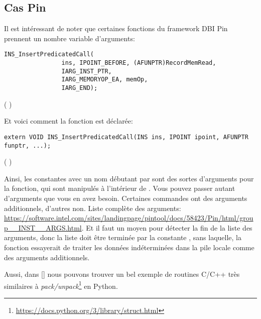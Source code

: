 \subsection{Cas Pin}

Il est intéressant de noter que certaines fonctions du framework \ac{DBI} Pin prennent
un nombre variable d'arguments:

\begin{lstlisting}[style=customc]
            INS_InsertPredicatedCall(
                ins, IPOINT_BEFORE, (AFUNPTR)RecordMemRead,
                IARG_INST_PTR,
                IARG_MEMORYOP_EA, memOp,
                IARG_END);
\end{lstlisting}
(  )

Et voici comment la fonction  est déclarée:

\begin{lstlisting}[style=customc]
extern VOID INS_InsertPredicatedCall(INS ins, IPOINT ipoint, AFUNPTR funptr, ...);
\end{lstlisting}
(  )

Ainsi, les constantes avec un nom débutant par  sont des sortes d'arguments
pour la fonction, qui sont manipulés à l'intérieur de .
Vous pouvez passer autant d'arguments que vous en avez besoin.
Certaines commandes ont des arguments additionnels, d'autres non.
Liste complète des arguments:
\url{https://software.intel.com/sites/landingpage/pintool/docs/58423/Pin/html/group__INST__ARGS.html}.
Et il faut un moyen pour détecter la fin de la liste des arguments, donc la liste
doit être terminée par la constante , sans laquelle, la fonction essayerait
de traiter les données indéterminées dans la pile locale comme des arguments additionnels.

Aussi, dans [\RobPikePractice] nous pouvons trouver un bel exemple de routines C/C++
très similaires à \emph{pack/unpack}\footnote{\url{https://docs.python.org/3/library/struct.html}}
en Python.

